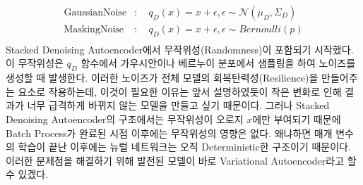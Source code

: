 \documentclass[draft=false]{oblivoir}
\begin{document}
\begin{equation}
	\begin{split}
		\mathrm{Gaussian Noise} &: \quad q_{D}(x) = x+\epsilon, \epsilon \sim \mathcal{N}(\mu_{D}, \Sigma_{D})\\
        \mathrm{Masking Noise} &: \quad q_{D}(x) = x+\epsilon, \epsilon \sim Bernoulli(p)\\
	\end{split}
    \label{eq:17-4}
\end{equation}
Stacked Denoising Autoencoder에서 무작위성(Randomness)이 포함되기 시작했다. 이 무작위성은 $q_D$ 함수에서 가우시안이나 베르누이 분포에서 샘플링을 하여 노이즈를 생성할 때 발생한다. 이러한 노이즈가 전체 모델의 회복탄력성(Resilience)을 만들어주는 요소로 작용하는데, 이것이 필요한 이유는 앞서 설명하였듯이 작은 변화로 인해 결과가 너무 급격하게 바뀌지 않는 모델을 만들고 싶기 때문이다. 그러나 Stacked Denoising Autoencoder의 구조에서는 무작위성이 오로지 $x$에만 부여되기 때문에 Batch Process가 완료된 시점 이후에는 무작위성의 영향은 없다. 왜냐하면 매개 변수의 학습이 끝난 이후에는 뉴럴 네트워크는 오직 Deterministic한 구조이기 때문이다. 이러한 문제점을 해결하기 위해 발전된 모델이 바로 Variational Autoencoder라고 할 수 있겠다.

\end{document}
